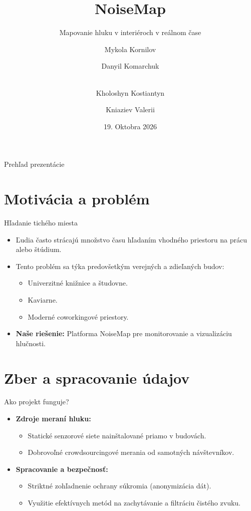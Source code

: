 \documentclass[10pt,twoside,slovak,a4paper]{beamer}
\title[NoiseMap]{NoiseMap}
\subtitle{Mapovanie hluku v interiéroch v reálnom čase}
\author[Kornilov a kol.]{
    Mykola Kornilov \and Danyil Komarchuk \and \\
    Kholoshyn Kostiantyn \and Kniaziev Valerii
}
\date{19. Oktobra 2026}
\begin{document}
\begin{frame}
    \titlepage
\end{frame}

\begin{frame}{Prehľad prezentácie}
    \tableofcontents
\end{frame}

\section{Motivácia a problém}

\begin{frame}{Hľadanie tichého miesta}
    \begin{itemize}
        \item Ľudia často strácajú množstvo času hľadaním vhodného priestoru na prácu alebo štúdium.
        \item Tento problém sa týka predovšetkým verejných a zdieľaných budov:
        \begin{itemize}
            \item Univerzitné knižnice a študovne.
            \item Kaviarne.
            \item Moderné coworkingové priestory.
        \end{itemize}
        \item \textbf{Naše riešenie:} Platforma NoiseMap pre monitorovanie a vizualizáciu hlučnosti.
    \end{itemize}
\end{frame}

\section{Zber a spracovanie údajov}

\begin{frame}{Ako projekt funguje?}
    \begin{itemize}
        \item \textbf{Zdroje meraní hluku:}
        \begin{itemize}
            \item Statické senzorové siete nainštalované priamo v budovách.
            \item Dobrovoľné crowdsourcingové merania od samotných návštevníkov.
        \end{itemize}
        \item \textbf{Spracovanie a bezpečnosť:}
        \begin{itemize}
            \item Striktné zohľadnenie ochrany súkromia (anonymizácia dát).
            \item Využitie efektívnych metód na zachytávanie a filtráciu čistého zvuku.
        \end{itemize}
    \end{itemize}
\end{frame}
\end{document}
